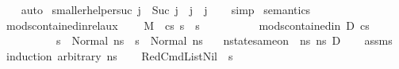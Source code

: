 \begin{isabellebody}
%
\isadelimproof
\ \ %
\endisadelimproof
%
\isatagproof
{}\isamarkupfalse%
\ auto%
\endisatagproof
{\isafoldproof}%
%
\isadelimproof
\isanewline
%
\endisadelimproof
\isanewline
{}\isamarkupfalse%
\ smaller{\isacharunderscore}{\kern0pt}helper{\isacharunderscore}{\kern0pt}suc{\isacharcolon}{\kern0pt}\ {\isachardoublequoteopen}j\ {\isacharequal}{\kern0pt}\ Suc\ j{\isacharprime}{\kern0pt}\ {\isasymLongrightarrow}\ j{\isacharprime}{\kern0pt}\ {\isacharless}{\kern0pt}\ j{\isachardoublequoteclose}\isanewline
%
\isadelimproof
\ \ %
\endisadelimproof
%
\isatagproof
{}\isamarkupfalse%
\ simp%
\endisatagproof
{\isafoldproof}%
%
\isadelimproof
\isanewline
%
\endisadelimproof
\isanewline
\isanewline
{}\isamarkupfalse%
\ semantics\ \isanewline
\isanewline
{}\isamarkupfalse%
\ mods{\isacharunderscore}{\kern0pt}contained{\isacharunderscore}{\kern0pt}in{\isacharunderscore}{\kern0pt}rel{\isacharunderscore}{\kern0pt}aux{\isacharcolon}{\kern0pt}\ \isanewline
\ \ \ {\isachardoublequoteopen}M{\isacharcomma}{\kern0pt}{\isasymLambda}{\isacharcomma}{\kern0pt}{\isasymGamma}{\isacharcomma}{\kern0pt}{\isasymOmega}\ {\isasymturnstile}\ {\isasymlangle}cs{\isacharcomma}{\kern0pt}\ s{\isasymrangle}\ {\isacharbrackleft}{\kern0pt}{\isasymrightarrow}{\isacharbrackright}{\kern0pt}\ s{\isacharprime}{\kern0pt}{\isachardoublequoteclose}\isanewline
\ \ \ \ \ \ \ \ \ \ {\isachardoublequoteopen}mods{\isacharunderscore}{\kern0pt}contained{\isacharunderscore}{\kern0pt}in\ D\ cs{\isachardoublequoteclose}\ \ \isanewline
\ \ \ \ \ \ \ \ \ \ {\isachardoublequoteopen}s\ {\isacharequal}{\kern0pt}\ Normal\ ns{\isachardoublequoteclose}\ \ {\isachardoublequoteopen}s{\isacharprime}{\kern0pt}\ {\isacharequal}{\kern0pt}\ Normal\ ns{\isacharprime}{\kern0pt}{\isachardoublequoteclose}\isanewline
\ \ \ {\isachardoublequoteopen}nstate{\isacharunderscore}{\kern0pt}same{\isacharunderscore}{\kern0pt}on\ {\isasymLambda}\ ns\ ns{\isacharprime}{\kern0pt}\ D{\isachardoublequoteclose}\isanewline
%
\isadelimproof
\ \ %
\endisadelimproof
%
\isatagproof
{}\isamarkupfalse%
\ assms\isanewline
{}\isamarkupfalse%
\ {\isacharparenleft}{\kern0pt}induction\ arbitrary{\isacharcolon}{\kern0pt}\ ns{\isacharparenright}{\kern0pt}\isanewline
\ \ \isamarkupfalse%
\ {\isacharparenleft}{\kern0pt}RedCmdListNil\ {\isasymOmega}\ s{\isacharparenright}{\kern0pt}\isanewline
\ \ \ \ \ \isamarkupfalse%

\end{isabellebody}
